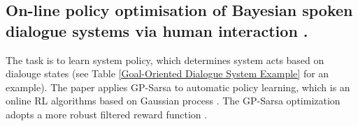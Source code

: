 \subsection{On-line policy optimisation of Bayesian spoken dialogue systems via human interaction \cite{Gasic2011}.}

The task is to learn system policy, which determines system acts based on dialouge states (see Table \ref{Goal-Oriented Dialogue System Example} for an example). The paper applies GP-Sarsa to automatic policy learning, which is an online RL algorithms based on Gaussian process \cite{Engel2014Reinforcement}. The GP-Sarsa optimization adopts a more robust filtered reward function \cite{Gasic2011}.
